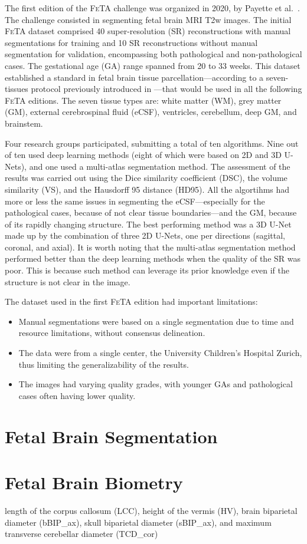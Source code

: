 The first edition of the \textsc{FeTA} challenge was organized in 2020, by Payette et al.\ \cite{FeTA2020_review}. The challenge consisted in segmenting fetal brain MRI T2w images. The initial \textsc{FeTA} dataset comprised 40 super-resolution (SR) reconstructions with manual segmentations for training and 10 SR reconstructions without manual segmentation for validation, encompassing both pathological and non-pathological cases. The gestational age (GA) range spanned from 20 to 33 weeks. This dataset established a standard in fetal brain tissue parcellation---according to a seven-tissues protocol previously introduced in \cite{Payette2020}---that would be used in all the following \textsc{FeTA} editions. The seven tissue types are: white matter (WM), grey matter (GM), external cerebrospinal fluid (eCSF), ventricles, cerebellum, deep GM, and brainstem.

Four research groups participated, submitting a total of ten algorithms. Nine out of ten used deep learning methods (eight of which were based on 2D and 3D U-Nets), and one used a multi-atlas segmentation method. The assessment of the results was carried out using the Dice similarity coefficient (DSC), the volume similarity (VS), and the Hausdorff 95 distance (HD95). All the algortihms had more or less the same issues in segmenting the eCSF---especially for the pathological cases, because of not clear tissue boundaries---and the GM, because of its rapidly changing structure. The best performing method was a 3D U-Net made up by the combination of three 2D U-Nets, one per directions (sagittal, coronal, and axial). It is worth noting that the multi-atlas segmentation method performed better than the deep learning methods when
the quality of the SR was poor. This is because such method can leverage its prior knowledge even if the structure is not clear in the image.

The dataset used in the first \textsc{FeTA} edition had important limitations:
\begin{itemize}
    \item Manual segmentations were based on a single segmentation due to time and resource limitations, without consensus delineation.
    \item The data were from a single center, the University Children's Hospital Zurich, thus limiting the generalizability of the results.
    \item The images had varying quality grades, with younger GAs and pathological cases often having lower quality.
\end{itemize}

\section{Fetal Brain Segmentation}

\section{Fetal Brain Biometry}
length of the corpus callosum (LCC), height of the vermis (HV), brain biparietal diameter (bBIP\_ax), skull biparietal diameter (sBIP\_ax), and maximum transverse cerebellar diameter (TCD\_cor)



